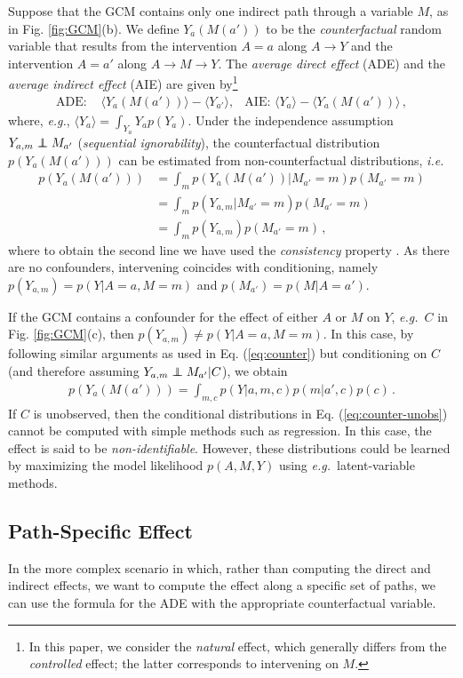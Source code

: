\documentclass{article}
\newcommand{\figref}[1]{Fig. \ref{#1}}
\renewcommand{\eqref}[1]{Eq. (\ref{#1})}
\newcommand\independent{\protect\mathpalette{\protect\independenT}{\perp}}
\def\independenT#1#2{\mathrel{\rlap{$#1#2$}\mkern2mu{#1#2}}}
\newcommand\ci{\independent}
\newcommand{\av}[1]{\langle #1 \rangle}
\newcommand{\ie}{\emph{i.e.}}
\newcommand{\eg}{\emph{e.g.}}
\begin{document}
Suppose that the GCM contains only one indirect path through a variable $M$, as in \figref{fig:GCM}(b).
We define $Y_{a}(M(a'))$ to be the \emph{counterfactual} random variable that results from the intervention $A=a$ along $A\rightarrow Y$ and the intervention $A=a'$ along $A\rightarrow M\rightarrow Y$. 
The \emph{average direct effect} (ADE) and the \emph{average indirect effect} (AIE) are given by\footnote{In this paper, we consider the \emph{natural} effect, which generally differs from the \emph{controlled} effect; the latter corresponds to intervening on $M$.}
\begin{align*}
\textrm{ADE: } & \av{Y_{a}(M(a'))}-\av{Y_{a'}}, & \textrm{AIE: } \av{Y_{a}} - \av{Y_{a}(M(a'))}\,,
\end{align*}
where, \eg, $\av{Y_{a}}=\int_{Y_{a}} Y_{a}p(Y_{a})$. %
Under the independence assumption $Y_{a,m}\ci M_{a'}$ (\emph{sequential ignorability}), the counterfactual distribution $p(Y_{a}(M(a')))$ can be estimated from non-counterfactual 
distributions, \ie
\begin{align}
p(Y_{a}(M(a'))) &=\int_m p(Y_a(M(a'))|M_{a'}\!=m)p(M_{a'}\!=m)\nonumber\\
&=\int_mp(Y_{a,m}|M_{a'}=m)p(M_{a'}=m)\nonumber\\
&=\int_mp(Y_{a,m})p(M_{a'}=m)\,,
\label{eq:counter}
\end{align}
where to obtain the second line we have used the \emph{consistency} property \cite{pearl16causal}. 
As there are no confounders, intervening coincides with conditioning, namely $p(Y_{a,m})=p(Y|A=a,M=m)$ and $p(M_{a'})=p(M|A=a')$. 

If the GCM contains a confounder for the effect of either $A$ or $M$ on $Y$, \eg~$C$ in \figref{fig:GCM}(c), 
then $p(Y_{a,m})\neq p(Y|A=a,M=m)$. In this case, by following similar arguments as used in \eqref{eq:counter} but conditioning on $C$ (and therefore assuming $Y_{a,m}\ci M_{a'}|C$), 
we obtain
\begin{align}
p(Y_{a}(M(a')))=\int_{m,c} p(Y| a,m,c)p(m|a',c)p(c)\,.
\label{eq:counter-unobs}
\end{align}
If $C$ is unobserved, then the conditional distributions in \eqref{eq:counter-unobs} cannot be computed with simple methods such as regression. 
In this case, the effect is said to be \emph{non-identifiable}. 
However, these distributions could be learned by maximizing the model likelihood $p(A,M,Y)$ using \eg~latent-variable methods.

\subsection{Path-Specific Effect\label{sec:pse}}
In the more complex scenario in which, rather than computing the direct and indirect effects, 
we want to compute the effect along a specific set of paths, 
we can use the formula for the ADE with the appropriate counterfactual variable.
 
\end{document}
